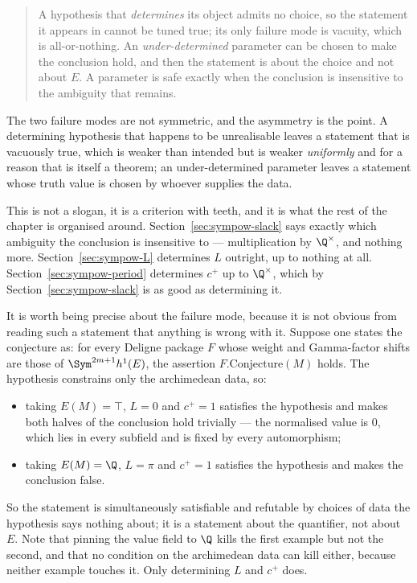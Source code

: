 \begin{quote}
  A hypothesis that \emph{determines} its object admits no choice, so the statement it appears
  in cannot be tuned true; its only failure mode is vacuity, which is all-or-nothing. An
  \emph{under-determined} parameter can be chosen to make the conclusion hold, and then the
  statement is about the choice and not about $E$. A parameter is safe exactly when the
  conclusion is insensitive to the ambiguity that remains.
\end{quote}

The two failure modes are not symmetric, and the asymmetry is the point. A determining
hypothesis that happens to be unrealisable leaves a statement that is vacuously true, which is
weaker than intended but is weaker \emph{uniformly} and for a reason that is itself a theorem;
an under-determined parameter leaves a statement whose truth value is chosen by whoever
supplies the data.

This is not a slogan, it is a criterion with teeth, and it is what the rest of the chapter is
organised around. Section~\ref{sec:sympow-slack} says exactly which ambiguity the conclusion
is insensitive to --- multiplication by $\Q^{\times}$, and nothing more.
Section~\ref{sec:sympow-L} determines $L$ outright, up to nothing at all.
Section~\ref{sec:sympow-period} determines $c^{+}$ up to $\Q^{\times}$, which by
Section~\ref{sec:sympow-slack} is as good as determining it.

\begin{remark}
  \label{rem:sympow-relative-fails}
  It is worth being precise about the failure mode, because it is not obvious from reading
  such a statement that anything is wrong with it. Suppose one states the conjecture as: for
  every Deligne package $F$ whose weight and Gamma-factor shifts are those of
  $\Sym^{2m+1}h^{1}(E)$, the assertion $F.\mathrm{Conjecture}(M)$ holds. The hypothesis
  constrains only the archimedean data, so:
  \begin{itemize}
    \item taking $E(M) = \top$, $L = 0$ and $c^{+} = 1$ satisfies the hypothesis and makes both
      halves of the conclusion hold trivially --- the normalised value is $0$, which lies in
      every subfield and is fixed by every automorphism;
    \item taking $E(M) = \Q$, $L = \pi$ and $c^{+} = 1$ satisfies the hypothesis and makes the
      conclusion false.
  \end{itemize}
  So the statement is simultaneously satisfiable and refutable by choices of data the
  hypothesis says nothing about; it is a statement about the quantifier, not about $E$. Note
  that pinning the value field to $\Q$ kills the first example but not the second, and
  that no condition on the archimedean data can kill either, because neither example touches
  it. Only determining $L$ and $c^{+}$ does.
\end{remark}

